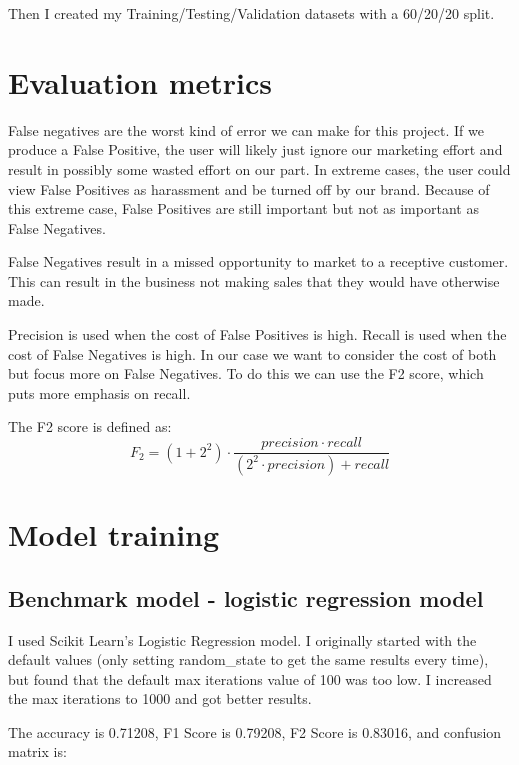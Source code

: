\documentclass{article}
\begin{document}
Then I created my Training/Testing/Validation datasets with a 60/20/20 split.

\section*{Evaluation metrics}

False negatives are the worst kind of error we can make for this project. If we produce a False Positive, the user will likely just ignore our marketing effort and result in possibly some wasted effort on our part. In extreme cases, the user could view False Positives as harassment and be turned off by our brand. Because of this extreme case, False Positives are still important but not as important as False Negatives.

False Negatives result in a missed opportunity to market to a receptive customer. This can result in the business not making sales that they would have otherwise made.

Precision is used when the cost of False Positives is high. Recall is used when the cost of False Negatives is high. In our case we want to consider the cost of both but focus more on False Negatives. To do this we can use the F2 score, which puts more emphasis on recall.

The F2 score is defined as:
\begin{equation}
	F_2 = (1+2^2) \cdot \dfrac{precision \cdot recall}{(2^2 \cdot precision)+recall}
\end{equation}
\newpage

\section*{Model training}

\subsection*{Benchmark model - logistic regression model}

I used Scikit Learn’s Logistic Regression model. I originally started with the default values (only setting random\_state to get the same results every time), but found that the default max iterations value of 100 was too low. I increased the max iterations to 1000 and got better results.

 The accuracy is 0.71208, F1 Score is 0.79208, F2 Score is 0.83016, and confusion matrix is:
 
\end{document}
